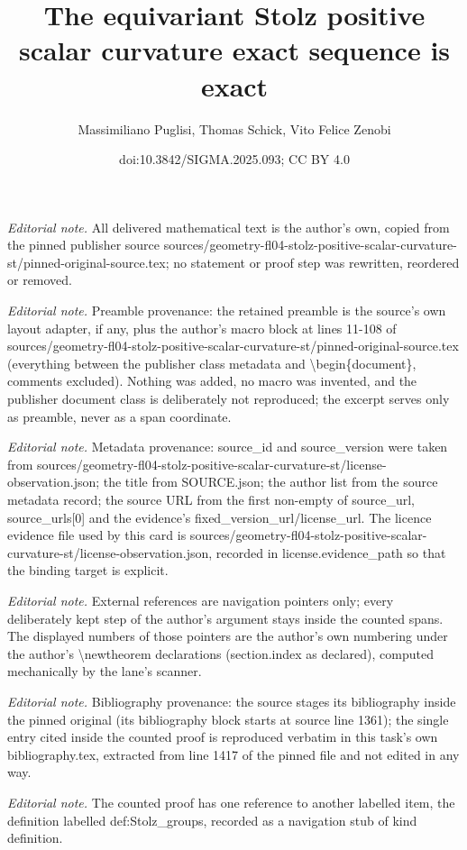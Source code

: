 \documentclass[10pt,a4paper]{amsart}
\title{The equivariant Stolz positive scalar curvature exact sequence is exact}
\author{Massimiliano Puglisi, Thomas Schick, Vito Felice Zenobi}
\date{doi:10.3842/SIGMA.2025.093; CC BY 4.0}
\begin{document}
\maketitle
\noindent\textit{Editorial note.} All delivered mathematical text is the author's own, copied from the pinned publisher source sources/geometry-fl04-stolz-positive-scalar-curvature-st/pinned-original-source.tex; no statement or proof step was rewritten, reordered or removed.\par\medskip
\noindent\textit{Editorial note.} Preamble provenance: the retained preamble is the source's own layout adapter, if any, plus the author's macro block at lines 11-108 of sources/geometry-fl04-stolz-positive-scalar-curvature-st/pinned-original-source.tex (everything between the publisher class metadata and \textbackslash{}begin\{document\}, comments excluded). Nothing was added, no macro was invented, and the publisher document class is deliberately not reproduced; the excerpt serves only as preamble, never as a span coordinate.\par\medskip
\noindent\textit{Editorial note.} Metadata provenance: source\_id and source\_version were taken from sources/geometry-fl04-stolz-positive-scalar-curvature-st/license-observation.json; the title from SOURCE.json; the author list from the source metadata record; the source URL from the first non-empty of source\_url, source\_urls[0] and the evidence's fixed\_version\_url/license\_url. The licence evidence file used by this card is sources/geometry-fl04-stolz-positive-scalar-curvature-st/license-observation.json, recorded in license.evidence\_path so that the binding target is explicit.\par\medskip
\noindent\textit{Editorial note.} External references are navigation pointers only; every deliberately kept step of the author's argument stays inside the counted spans. The displayed numbers of those pointers are the author's own numbering under the author's \textbackslash{}newtheorem declarations (section.index as declared), computed mechanically by the lane's scanner.\par\medskip
\noindent\textit{Editorial note.} Bibliography provenance: the source stages its bibliography inside the pinned original (its bibliography block starts at source line 1361); the single entry cited inside the counted proof is reproduced verbatim in this task's own bibliography.tex, extracted from line 1417 of the pinned file and not edited in any way.\par\medskip
\noindent\textit{Editorial note.} The counted proof has one reference to another labelled item, the definition labelled def:Stolz\_groups, recorded as a navigation stub of kind definition.\par\medskip
\end{document}
